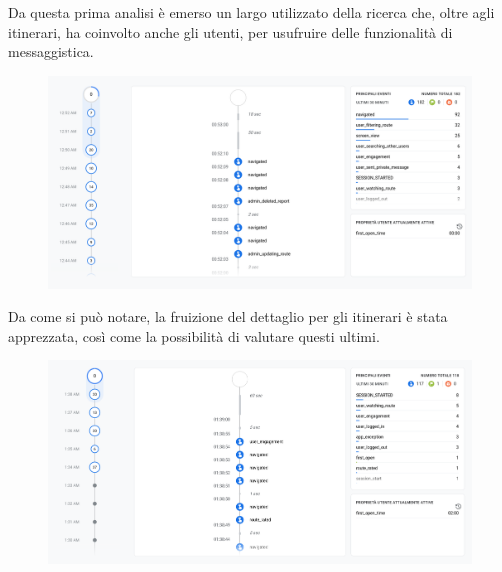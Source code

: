 \documentclass{natourDoc}
\begin{document}
Da questa prima analisi è emerso un largo utilizzato della ricerca che, oltre agli itinerari, ha coinvolto anche 
gli utenti, per usufruire delle funzionalità di messaggistica.
\begin{figure}[!htbp]
	\centering
	\includegraphics[width=\textwidth]{./analytics/debug-mario.png}
\end{figure}
\FloatBarrier

\newpage

Da come si può notare, la fruizione del dettaglio per gli itinerari è stata apprezzata,
così come la possibilità di valutare questi ultimi.
\begin{figure}[!htbp]
	\centering
	\includegraphics[width=\textwidth]{./analytics/debug-emu1.png}
\end{figure}
\FloatBarrier
\end{document}
